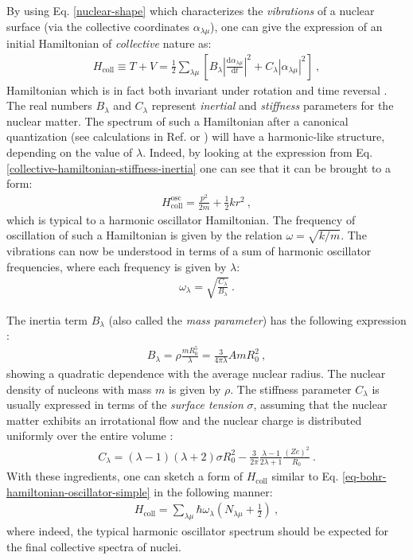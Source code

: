 By using Eq. \ref{nuclear-shape} which characterizes the \emph{vibrations} of a nuclear surface (via the collective coordinates $\alpha_{\lambda\mu}$), one can give the expression of an initial Hamiltonian of \emph{collective} nature as:
\begin{align}
    H_\text{coll}\equiv T+V=\frac{1}{2}\sum_{\lambda\mu}\left[B_\lambda\left|\frac{\text{d}\alpha_{\lambda\mu}}{\text{d}t}\right|^2+C_\lambda|\alpha_{\lambda\mu}|^2\right]\ ,
    \label{collective-hamiltonian-stiffness-inertia}
\end{align}
Hamiltonian which is in fact both invariant under rotation and time reversal \cite{messiah2014quantum}.  The real numbers $B_\lambda$ and $C_\lambda$ represent \emph{inertial} and \emph{stiffness} parameters for the nuclear matter. The spectrum of such a Hamiltonian after a canonical quantization (see calculations in Ref. \cite{ring2004nuclear} or \cite{bertulani2007nuclear}) will have a harmonic-like structure, depending on the value of $\lambda$. Indeed, by looking at the expression from Eq. \ref{collective-hamiltonian-stiffness-inertia} one can see that it can be brought to a form:
\begin{align}
    H_\text{coll}^\text{osc}=\frac{p^2}{2m}+\frac{1}{2}kr^2\ ,
    \label{eq-bohr-hamiltonian-oscillator-simple}
\end{align}
which is typical to a harmonic oscillator Hamiltonian. The frequency of oscillation of such a Hamiltonian is given by the relation $\omega=\sqrt{k/m}$. The vibrations can now be understood in terms of a sum of harmonic oscillator frequencies, where each frequency is given by $\lambda$:
\begin{align}
\omega_\lambda=\sqrt{\frac{C_\lambda}{B_\lambda}}\ .
\end{align}

The inertia term $B_\lambda$ (also called the \emph{mass parameter}) has the following expression \cite{ring2004nuclear}:
\begin{align}
    B_\lambda=\rho \frac{mR_0^5}{\lambda}=\frac{3}{4\pi\lambda}AmR_0^2\ ,
    \label{inertia-parameters-B}
\end{align}
showing a quadratic dependence with the average nuclear radius. The nuclear density of nucleons with mass $m$ is given by $\rho$. The stiffness parameter $C_\lambda$ is usually expressed in terms of the \emph{surface tension} $\sigma$, assuming that the nuclear matter exhibits an irrotational flow and the nuclear charge is distributed uniformly over the entire volume \cite{ring2004nuclear}:
\begin{align}
    C_\lambda=(\lambda-1)(\lambda+2)\sigma R_0^2-\frac{3}{2\pi}\frac{\lambda-1}{2\lambda+1}\frac{(Ze)^2}{R_0}\ .
    \label{stiffness-parameters-C}
\end{align}
With these ingredients, one can sketch a form of $H_\text{coll}$ similar to Eq. \ref{eq-bohr-hamiltonian-oscillator-simple} in the following manner:
\begin{align}
    H_\text{coll}=\sum_{\lambda\mu}\hbar\omega_\lambda\left(N_{\lambda\mu}+\frac{1}{2}\right)\ ,
\end{align}
where indeed, the typical harmonic oscillator spectrum should be expected for the final collective spectra of nuclei.

